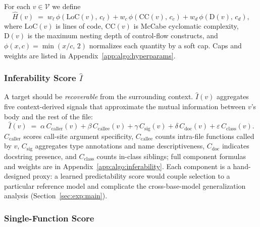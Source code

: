 For each $v \in \mathcal{V}$ we define
\vspace{-0.5ex}
\begin{equation}
  \hat{H}(v) \;=\; w_{\ell}\,\phi\!\left(\mathrm{LoC}(v),\,c_{\ell}\right)
            + w_{c}\,\phi\!\left(\mathrm{CC}(v),\,c_{c}\right)
            + w_{d}\,\phi\!\left(\mathrm{D}(v),\,c_{d}\right),
  \label{eq:complexity}
\end{equation}
where $\mathrm{LoC}(v)$ is lines of code, $\mathrm{CC}(v)$ is McCabe
cyclomatic complexity, $\mathrm{D}(v)$ is the maximum nesting depth of
control-flow constructs, and $\phi(x,c)\!=\!\min(x/c,\,2)$ normalizes
each quantity by a soft cap. Caps and weights are listed in
Appendix~\ref{app:algo:hyperparams}.

\subsubsection{Inferability Score $\hat{I}$}
\label{sec:method:inferability}

A target should be \emph{recoverable} from the surrounding context.
$\hat{I}(v)$ aggregates five context-derived signals that approximate
the mutual information between $v$'s body and the rest of the file:
\vspace{-0.5ex}
\begin{equation}
  \hat{I}(v) \;=\; \alpha\,C_{\mathrm{caller}}(v)
              + \beta\,C_{\mathrm{callee}}(v)
              + \gamma\,C_{\mathrm{sig}}(v)
              + \delta\,C_{\mathrm{doc}}(v)
              + \varepsilon\,C_{\mathrm{class}}(v).
  \label{eq:inferability}
\end{equation}
$C_{\mathrm{caller}}$ scores call-site argument specificity,
$C_{\mathrm{callee}}$ counts intra-file functions called by $v$,
$C_{\mathrm{sig}}$ aggregates type annotations and name descriptiveness,
$C_{\mathrm{doc}}$ indicates docstring presence, and
$C_{\mathrm{class}}$ counts in-class siblings; full component formulas
and weights are in Appendix~\ref{app:algo:inferability}. Each component
is a hand-designed proxy: a learned predictability score would couple
selection to a particular reference model and complicate the
cross-base-model generalization analysis (Section~\ref{sec:exp:main}).

\subsubsection{Single-Function Score}
\label{sec:method:single}


